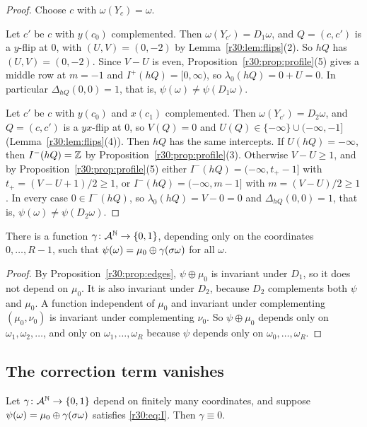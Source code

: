\begin{proof}
Choose $c$ with $\omega(Y_c)=\omega$.

Let $c'$ be $c$ with $y(c_0)$ complemented. Then $\omega(Y_{c'})=D_1\omega$, and $Q=(c,c')$ is a $y$-flip at $0$, with $(U,V)=(0,-2)$ by Lemma~\ref{r30:lem:flips}(2). So $hQ$ has $(U,V)=(0,-2)$. Since $V-U$ is even, Proposition~\ref{r30:prop:profile}(5) gives a middle row at $m=-1$ and $I^+(hQ)=[0,\infty)$, so $\lambda_0(hQ)=0+U=0$. In particular $\Delta_{hQ}(0,0)=1$, that is, $\psi(\omega)\ne\psi(D_1\omega)$.

Let $c'$ be $c$ with $y(c_0)$ and $x(c_1)$ complemented. Then $\omega(Y_{c'})=D_2\omega$, and $Q=(c,c')$ is a $yx$-flip at $0$, so $V(Q)=0$ and $U(Q)\in\{-\infty\}\cup(-\infty,-1]$ (Lemma~\ref{r30:lem:flips}(4)). Then $hQ$ has the same intercepts. If $U(hQ)=-\infty$, then $I^-(hQ)=\mathbb{Z}$ by Proposition~\ref{r30:prop:profile}(3). Otherwise $V-U\ge1$, and by Proposition~\ref{r30:prop:profile}(5) either $I^-(hQ)=(-\infty,t_+-1]$ with $t_+=(V-U+1)/2\ge1$, or $I^-(hQ)=(-\infty,m-1]$ with $m=(V-U)/2\ge1$. In every case $0\in I^-(hQ)$, so $\lambda_0(hQ)=V-0=0$ and $\Delta_{hQ}(0,0)=1$, that is, $\psi(\omega)\ne\psi(D_2\omega)$.
\end{proof}

\begin{corollary}\label{r30:cor:psi}
There is a function $\gamma\colon\mathcal{A}^{\mathbb{N}}\to\{0,1\}$, depending only on the coordinates $0,\dots,R-1$, such that $\psi(\omega)=\mu_0\oplus\gamma(\sigma\omega)$ for all $\omega$.
\end{corollary}

\begin{proof}
By Proposition~\ref{r30:prop:edges}, $\psi\oplus\mu_0$ is invariant under $D_1$, so it does not depend on $\mu_0$. It is also invariant under $D_2$, because $D_2$ complements both $\psi$ and $\mu_0$. A function independent of $\mu_0$ and invariant under complementing $(\mu_0,\nu_0)$ is invariant under complementing $\nu_0$. So $\psi\oplus\mu_0$ depends only on $\omega_1,\omega_2,\dots$, and only on $\omega_1,\dots,\omega_R$ because $\psi$ depends only on $\omega_0,\dots,\omega_R$.
\end{proof}

\subsection{The correction term vanishes}\label{r30:sec:gamma}

\begin{lemma}\label{r30:lem:gamma}
Let $\gamma\colon\mathcal{A}^{\mathbb{N}}\to\{0,1\}$ depend on finitely many coordinates, and suppose $\psi(\omega)=\mu_0\oplus\gamma(\sigma\omega)$ satisfies \eqref{r30:eq:I}. Then $\gamma\equiv0$.
\end{lemma}


